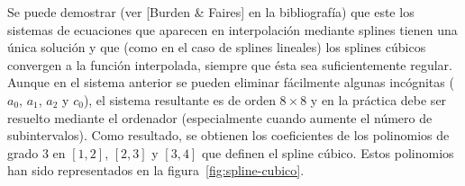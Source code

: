    Se puede demostrar (ver [Burden \& Faires] en la bibliografía) que
   este los sistemas de ecuaciones que aparecen en interpolación
   mediante splines tienen una única solución y que (como en el caso de
   splines lineales) los splines cúbicos convergen a la función
   interpolada, siempre que ésta sea suficientemente regular. Aunque
   en el sistema anterior se pueden eliminar fácilmente algunas
   incógnitas ($a_0$, $a_1$, $a_2$ y $c_0$), el sistema resultante es
   de orden $8\times 8$ y en la práctica debe ser resuelto mediante el
   ordenador (especialmente cuando  aumente el número de
   subintervalos). Como resultado, se obtienen los coeficientes de los
   polinomios de grado $3$ en $[1,2]$, $[2,3]$ y $[3,4]$ que definen
   el spline cúbico. Estos polinomios han sido representados en la
   figura~\ref{fig:spline-cubico}.




